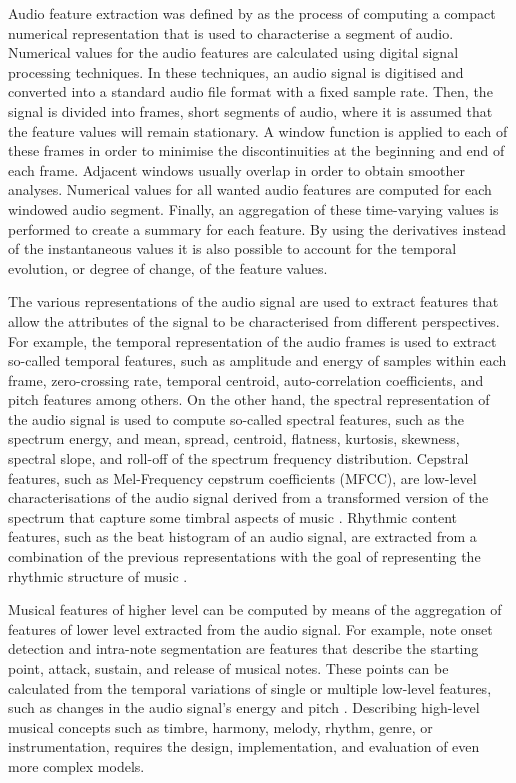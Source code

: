 Audio feature extraction was defined by \textcite{tzanetakis02musical} as the process of computing a compact numerical representation that is used to characterise a segment of audio.
Numerical values for the audio features are calculated using digital signal processing techniques. In these techniques, an audio signal is digitised and converted into a standard audio file format with a fixed sample rate. Then, the signal is divided into frames, short segments of audio, where it is assumed that the feature values will remain stationary. 
A window function is applied to each of these frames in order to minimise the discontinuities at the beginning and end of each frame. Adjacent windows usually overlap in order to obtain smoother analyses. 
Numerical values for all wanted audio features are computed for each windowed audio segment. 
Finally, an aggregation of these time-varying values is performed to create a summary for each feature.
By using the derivatives instead of the instantaneous values it is also possible to account for the temporal evolution, or degree of change, of the feature values. 

The various representations of the audio signal are used to extract features that allow the attributes of the signal to be characterised from different perspectives. 
For example, the temporal representation of the audio frames is used to extract so-called temporal features, such as amplitude and energy of samples within each frame, zero-crossing rate, temporal centroid, auto-correlation coefficients, and pitch features among others. 
On the other hand, the spectral representation of the audio signal is used to compute so-called spectral features, such as the spectrum energy, and mean, spread, centroid, flatness, kurtosis, skewness, spectral slope, and roll-off of the spectrum frequency distribution. 
Cepstral features, such as Mel-Frequency cepstrum coefficients (MFCC), are low-level characterisations of the audio signal derived from a transformed version of the spectrum that capture some timbral aspects of music \autocite{gouyon08content}.
Rhythmic content features, such as the beat histogram of an audio signal, are extracted from a combination of the previous representations with the goal of representing the rhythmic structure of music \autocite{tzanetakis02musical}. 

Musical features of higher level can be computed by means of the aggregation of features of lower level extracted from the audio signal. For example, note onset detection and intra-note segmentation are features that describe the starting point, attack, sustain, and release of musical notes. These points can be calculated from the temporal variations of single or multiple low-level features, such as changes in the audio signal's energy and pitch \autocite{gouyon08content}.
Describing high-level musical concepts such as timbre, harmony, melody, rhythm, genre, or instrumentation, requires the design, implementation, and evaluation of even more complex models. 


